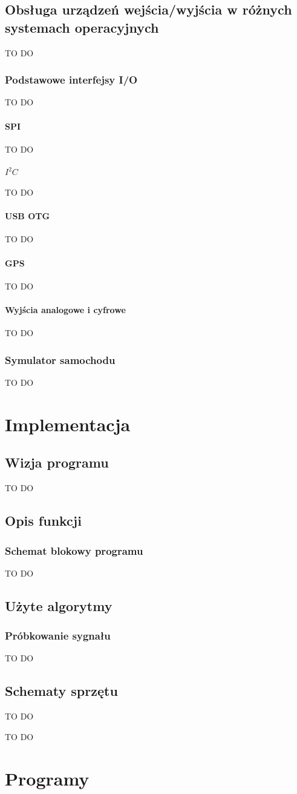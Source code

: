 \documentclass{xmgr}
\begin{document}
\section{Obsługa urządzeń wejścia/wyjścia w różnych systemach operacyjnych}
TO DO
\subsection{Podstawowe interfejsy I/O}
TO DO
\subsubsection{SPI}
TO DO
\subsubsection{$I^2C$}
TO DO
\subsubsection{USB OTG}
TO DO
\subsubsection{GPS}
TO DO
\subsubsection{Wyjścia analogowe i cyfrowe}
TO DO
\subsection{Symulator samochodu}
TO DO

\chapter{Implementacja}
\section{Wizja programu}
TO DO
\section{Opis funkcji}
\subsection{Schemat blokowy programu}
TO DO
\section{Użyte algorytmy}
\subsection{Próbkowanie sygnału}
TO DO
\section{Schematy sprzętu}
TO DO

\summary
TO DO

\appendix
\chapter{Programy}




\listoftables

\listoffigures

\oswiadczenie
\end{document}
